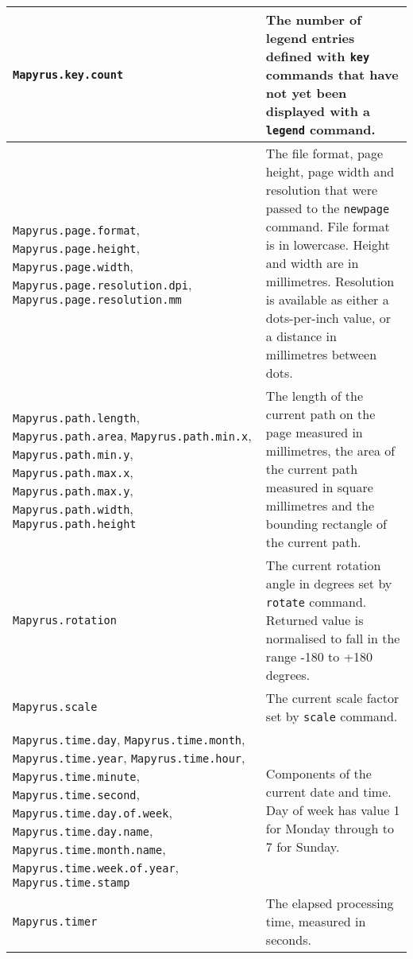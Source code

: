 \begin{longtable}{|p{5cm}|p{7cm}|}
\hline

\texttt{Mapyrus.key.count} &
The number of legend entries defined with
\texttt{key} commands that have not yet
been displayed with a
\texttt{legend} command. \\

\hline

\texttt{Mapyrus.page.format},
\texttt{Mapyrus.page.height},
\texttt{Mapyrus.page.width},
\texttt{Mapyrus.page.resolution.dpi},
\texttt{Mapyrus.page.resolution.mm} &
The file format, page height, page width
and resolution that were passed to the
\texttt{newpage} command.  File format is in lowercase.
Height and width are in millimetres.  Resolution is available
as either a dots-per-inch value, or a distance in millimetres between
dots. \\

\hline

\texttt{Mapyrus.path.length},
\texttt{Mapyrus.path.area},
\texttt{Mapyrus.path.min.x},
\texttt{Mapyrus.path.min.y},
\texttt{Mapyrus.path.max.x},
\texttt{Mapyrus.path.max.y},
\texttt{Mapyrus.path.width},
\texttt{Mapyrus.path.height} &
The length of the current path on the page measured in millimetres,
the area of the current path measured in square millimetres
and the bounding rectangle of the current path. \\

\hline

\texttt{Mapyrus.rotation} &
The current rotation angle in degrees set by
\texttt{rotate} command.
Returned value is normalised to fall in the
range -180 to +180 degrees. \\

\hline

\texttt{Mapyrus.scale} &
The current scale factor set by \texttt{scale} command. \\

\hline

\texttt{Mapyrus.time.day},
\texttt{Mapyrus.time.month},
\texttt{Mapyrus.time.year},
\texttt{Mapyrus.time.hour},
\texttt{Mapyrus.time.minute},
\texttt{Mapyrus.time.second},
\texttt{Mapyrus.time.day.of.week},
\texttt{Mapyrus.time.day.name},
\texttt{Mapyrus.time.month.name},
\texttt{Mapyrus.time.week.of.year},
\texttt{Mapyrus.time.stamp}
&
Components of the current date and time.
Day of week has value 1 for Monday through to 7 for Sunday.

\\

\hline

\texttt{Mapyrus.timer} &
The elapsed processing time, measured in seconds. \\


\end{longtable}
